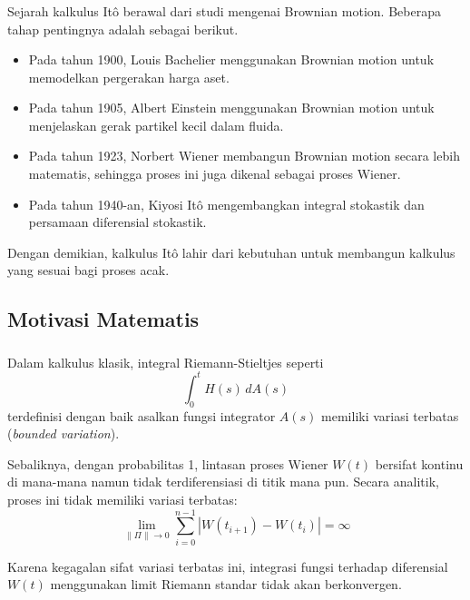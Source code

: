 \documentclass[aspectratio=169,11pt]{beamer}
\theoremstyle{definition}
\begin{document}
\begin{frame}
  \frametitle{\insertsection}
  \framesubtitle{\insertsubsection}

  Sejarah kalkulus Itô berawal dari studi mengenai Brownian motion. Beberapa
  tahap pentingnya adalah sebagai berikut.

  \begin{itemize}
    \item Pada tahun 1900, Louis Bachelier menggunakan Brownian motion untuk
          memodelkan pergerakan harga aset.

    \item Pada tahun 1905, Albert Einstein menggunakan Brownian motion untuk
          menjelaskan gerak partikel kecil dalam fluida.

    \item Pada tahun 1923, Norbert Wiener membangun Brownian motion secara
          lebih matematis, sehingga proses ini juga dikenal sebagai proses Wiener.

    \item Pada tahun 1940-an, Kiyosi Itô mengembangkan integral stokastik dan
          persamaan diferensial stokastik.
  \end{itemize}

  \medskip

  Dengan demikian, kalkulus Itô lahir dari kebutuhan untuk membangun kalkulus yang
  sesuai bagi proses acak.

\end{frame}

\subsection{Motivasi Matematis}

\begin{frame}
  \frametitle{\insertsection}
  \framesubtitle{\insertsubsection}

  Dalam kalkulus klasik, integral Riemann-Stieltjes seperti
  \[ \int_0^t H(s) \, dA(s) \]
  terdefinisi dengan baik asalkan fungsi integrator $A(s)$ memiliki variasi terbatas (\textit{bounded variation}).

  \vspace{0.3cm}
  Sebaliknya, dengan probabilitas 1, lintasan proses Wiener $W(t)$ bersifat kontinu di mana-mana namun tidak terdiferensiasi di titik mana pun. Secara analitik, proses ini tidak memiliki variasi terbatas:
  \[ \lim_{\|\Pi\| \to 0} \sum_{i=0}^{n-1} |W(t_{i+1}) - W(t_i)| = \infty \]

  \vspace{0.3cm}
  Karena kegagalan sifat variasi terbatas ini, integrasi fungsi terhadap diferensial $W(t)$ menggunakan limit Riemann standar tidak akan berkonvergen.
\end{frame}
\end{document}
